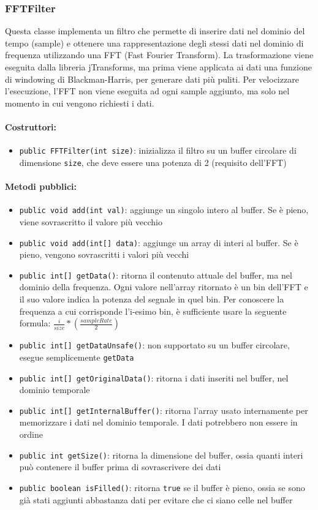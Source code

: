 \subsubsection{FFTFilter}
Questa classe implementa un filtro che permette di inserire dati nel dominio del tempo (sample) e ottenere una rappresentazione degli stessi dati nel dominio di frequenza utilizzando una FFT (Fast Fourier Transform). La trasformazione viene eseguita dalla libreria jTransforms, ma prima viene applicata ai dati una funzione di windowing di Blackman-Harris, per generare dati più puliti. Per velocizzare l'esecuzione, l'FFT non viene eseguita ad ogni sample aggiunto, ma solo nel momento in cui vengono richiesti i dati.

\paragraph{Costruttori:}\begin{itemize}
	\item \texttt{public FFTFilter(int size)}: inizializza il filtro su un buffer circolare di dimensione \texttt{size}, che deve essere una potenza di 2 (requisito dell'FFT)
\end{itemize}

\paragraph{Metodi pubblici:} \begin{itemize}
	\item \texttt{public void add(int val)}: aggiunge un singolo intero al buffer. Se è pieno, viene sovrascritto il valore più vecchio
	\item \texttt{public void add(int[] data)}: aggiunge un array di interi al buffer. Se è pieno, vengono sovrascritti i valori più vecchi
	\item \texttt{public int[] getData()}: ritorna il contenuto attuale del buffer, ma nel dominio della frequenza. Ogni valore nell'array ritornato è un bin dell'FFT e il suo valore indica la potenza del segnale in quel bin. Per conoscere la frequenza a cui corrisponde l'i-esimo bin, è sufficiente usare la seguente formula: $\frac{i}{size}*(\frac{sampleRate}{2})$
	\item \texttt{public int[] getDataUnsafe()}: non supportato su un buffer circolare, esegue semplicemente \texttt{getData}
	\item \texttt{public int[] getOriginalData()}: ritorna i dati inseriti nel buffer, nel dominio temporale
	\item \texttt{public int[] getInternalBuffer()}: ritorna l'array usato internamente per memorizzare i dati nel dominio temporale. I dati potrebbero non essere in ordine
	\item \texttt{public int getSize()}: ritorna la dimensione del buffer, ossia quanti interi può contenere il buffer prima di sovrascrivere dei dati
	\item \texttt{public boolean isFilled()}: ritorna \texttt{true} se il buffer è pieno, ossia se sono già stati aggiunti abbastanza dati per evitare che ci siano celle nel buffer
\end{itemize}

